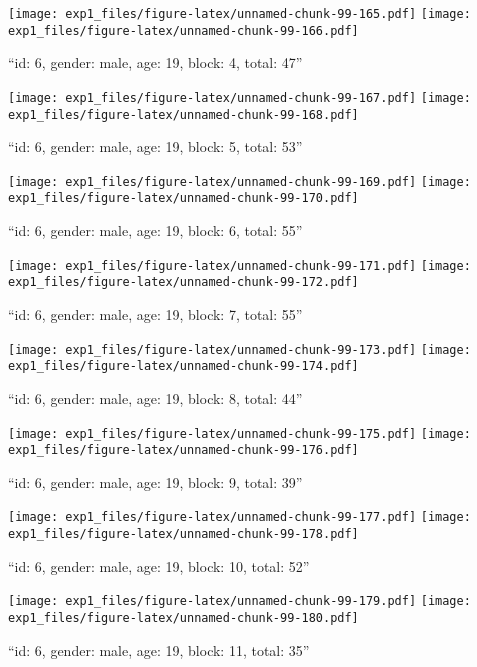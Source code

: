 \documentclass[,]{article}
\begin{document}
\texttt{[image: exp1\_files/figure-latex/unnamed-chunk-99-165.pdf]}
\texttt{[image: exp1\_files/figure-latex/unnamed-chunk-99-166.pdf]}

\newpage
[1] 

``id: 6, gender: male, age: 19, block: 4, total: 47''

\texttt{[image: exp1\_files/figure-latex/unnamed-chunk-99-167.pdf]}
\texttt{[image: exp1\_files/figure-latex/unnamed-chunk-99-168.pdf]}

\newpage
[1] 

``id: 6, gender: male, age: 19, block: 5, total: 53''

\texttt{[image: exp1\_files/figure-latex/unnamed-chunk-99-169.pdf]}
\texttt{[image: exp1\_files/figure-latex/unnamed-chunk-99-170.pdf]}

\newpage
[1] 

``id: 6, gender: male, age: 19, block: 6, total: 55''

\texttt{[image: exp1\_files/figure-latex/unnamed-chunk-99-171.pdf]}
\texttt{[image: exp1\_files/figure-latex/unnamed-chunk-99-172.pdf]}

\newpage
[1] 

``id: 6, gender: male, age: 19, block: 7, total: 55''

\texttt{[image: exp1\_files/figure-latex/unnamed-chunk-99-173.pdf]}
\texttt{[image: exp1\_files/figure-latex/unnamed-chunk-99-174.pdf]}

\newpage
[1] 

``id: 6, gender: male, age: 19, block: 8, total: 44''

\texttt{[image: exp1\_files/figure-latex/unnamed-chunk-99-175.pdf]}
\texttt{[image: exp1\_files/figure-latex/unnamed-chunk-99-176.pdf]}

\newpage
[1] 

``id: 6, gender: male, age: 19, block: 9, total: 39''

\texttt{[image: exp1\_files/figure-latex/unnamed-chunk-99-177.pdf]}
\texttt{[image: exp1\_files/figure-latex/unnamed-chunk-99-178.pdf]}

\newpage
[1] 

``id: 6, gender: male, age: 19, block: 10, total: 52''

\texttt{[image: exp1\_files/figure-latex/unnamed-chunk-99-179.pdf]}
\texttt{[image: exp1\_files/figure-latex/unnamed-chunk-99-180.pdf]}

\newpage
[1] 

``id: 6, gender: male, age: 19, block: 11, total: 35''
\end{document}
